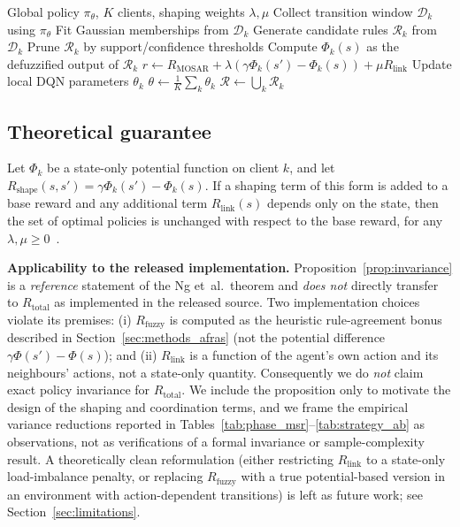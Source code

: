 \documentclass[ai,article,submit,moreauthors,pdftex]{Definitions/mdpi}
\newenvironment{proposition}{\begin{Proposition}}{\end{Proposition}}
\newcommand{\rev}[1]{#1}
\begin{document}
\begin{algorithm}[!htbp]
\caption{AFRAS-FL training round}\label{alg:afras_fl}
\begin{algorithmic}[1]
\Require Global policy $\pi_\theta$, $K$ clients, shaping weights
 $\lambda,\mu$
  \State Collect transition window $\mathcal{D}_k$ using $\pi_\theta$
  \State \rev{Fit Gaussian memberships from $\mathcal{D}_k$}
  \State Generate candidate rules $\mathcal{R}_k$ from $\mathcal{D}_k$
  \State Prune $\mathcal{R}_k$ by support/confidence thresholds
  \State Compute $\Phi_k(s)$ as the defuzzified output of $\mathcal{R}_k$
    \State $r \gets R_{\text{MOSAR}}
             + \lambda(\gamma \Phi_k(s') - \Phi_k(s))
             + \mu R_{\text{link}}$
  \EndFor
  \State Update local DQN parameters $\theta_k$
\EndFor
\State $\theta \gets \tfrac{1}{K}\sum_k \theta_k$
\State $\mathcal{R} \gets \bigcup_k \mathcal{R}_k$ 
\end{algorithmic}
\end{algorithm}

\subsection{Theoretical guarantee}\label{sec:methods_theory}

\begingroup\color{black}
\begin{proposition}[Reference PBRS condition]\label{prop:invariance}
Let $\Phi_k$ be a state-only potential function on client $k$, and let
$R_{\text{shape}}(s,s') = \gamma \Phi_k(s') - \Phi_k(s)$. If a shaping
term of this form is added to a base reward and any additional term
$R_{\text{link}}(s)$ depends only on the state, then the set of optimal
policies is unchanged with respect to the base reward, for any
$\lambda, \mu \ge 0$~\cite{ng1999policy_invariance}.
\end{proposition}

\textbf{Applicability to the released implementation.}
Proposition~\ref{prop:invariance} is a \emph{reference} statement of the
Ng et~al.\ theorem and \emph{does not} directly transfer to
$R_{\text{total}}$ as implemented in the released source. Two
implementation choices violate its premises:
(i) $R_{\text{fuzzy}}$ is computed as the heuristic rule-agreement bonus
described in Section~\ref{sec:methods_afras} (not the potential
difference $\gamma \Phi(s') - \Phi(s)$); and
(ii) $R_{\text{link}}$ is a function of the agent's own action and its
neighbours' actions, not a state-only quantity.
Consequently we do \emph{not} claim exact policy invariance for
$R_{\text{total}}$. We include the proposition only to motivate the
design of the shaping and coordination terms, and we frame the
empirical variance reductions reported in
Tables~\ref{tab:phase_msr}--\ref{tab:strategy_ab} as observations, not
as verifications of a formal invariance or sample-complexity result. A
theoretically clean reformulation (either restricting $R_{\text{link}}$
to a state-only load-imbalance penalty, or replacing $R_{\text{fuzzy}}$
with a true potential-based version in an environment with
action-dependent transitions) is left as future work; see
Section~\ref{sec:limitations}.
\endgroup
\end{document}

